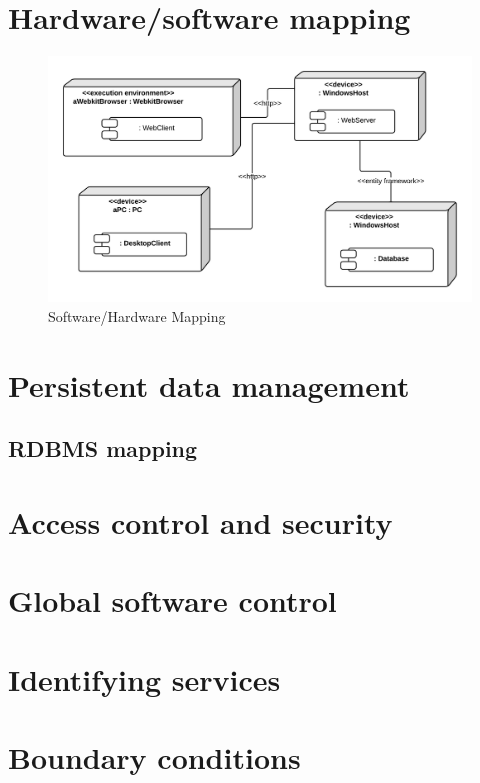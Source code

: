 


\section{Hardware/software mapping}

\begin{figure}[H]
\includegraphics[scale=0.2]{img/SoftwareHardwareMapping.png}
\caption{Software/Hardware Mapping}
\label{fig:SoftwareHardwareMapping}
\end{figure}

\section{Persistent data management}

\subsection{RDBMS mapping}

\section{Access control and security}

\section{Global software control}

\section{Identifying services}

\section{Boundary conditions}


